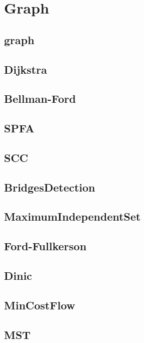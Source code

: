 \section{Graph}

\subsection{graph}


\subsection{Dijkstra}


\subsection{Bellman-Ford}


\subsection{SPFA}


\subsection{SCC}


\subsection{BridgesDetection}


\subsection{MaximumIndependentSet}


\subsection{Ford-Fullkerson}


\subsection{Dinic}


\subsection{MinCostFlow}


\subsection{MST}


